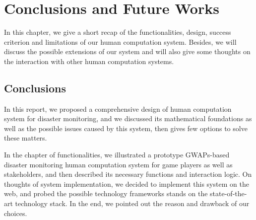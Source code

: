 \section{Conclusions and Future Works}

In this chapter, we give a short recap of the functionalities, design, success criterion and limitations of our human computation system. Besides, we will discuss the possible extensions of our system and will also give some thoughts on the interaction with other human computation systems.

\subsection{Conclusions}

In this report, we proposed a comprehensive design of human computation system for disaster monitoring,
and we discussed its mathematical foundations as well as the possible issues caused by this system,
then gives few options to solve these matters. 

In the chapter of functionalities, we illustrated a prototype GWAPs-based disaster monitoring
human computation system for game players as well as stakeholders, and then described its
necessary functions and interaction logic. On thoughts of system implementation, we decided to implement 
this system on the web, and probed the possible technology frameworks stands on the state-of-the-art technology stack.
In the end, we pointed out the reason and drawback of our choices.

